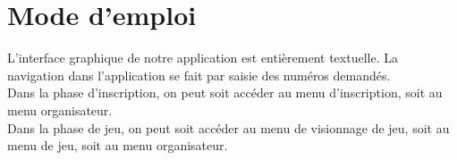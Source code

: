\documentclass[10pt,a4paper]{report}
\begin{document}
\paragraph{}

\chapter*{Mode d'emploi}
L'interface graphique de notre application est entièrement
textuelle. La navigation dans l'application se fait par saisie des
numéros demandés.\\
Dans la phase d'inscription, on peut soit accéder au menu
d'inscription, soit au menu organisateur. \\
Dans la phase de jeu, on peut soit accéder au menu de visionnage de
jeu, soit au menu de jeu, soit au menu organisateur.\\ \\


\end{document}
